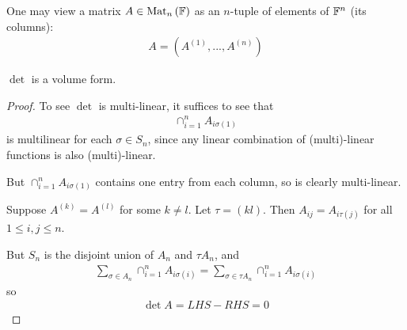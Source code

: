 \documentclass[a4paper]{article}
\begin{document}

One may view a matrix $A \in \operatorname{Mat}_n \left(\mathbb{F}\right)$ as an $n$-tuple of elements of $\mathbb{F}^n$ (its columns):
\begin{equation*}
\begin{aligned}
A = \left(A^{(1)},...,A^{(n)}\right)
\end{aligned}
\end{equation*}

\begin{lemma}
$\det$ is a volume form.
\begin{proof}
To see $\det$ is multi-linear, it suffices to see that 
\begin{equation*}
\begin{aligned}
\cap_{i=1}^n A_{i \sigma\left(1\right)}
\end{aligned}
\end{equation*}
is multilinear for each $\sigma \in S_n$, since any linear combination of (multi)-linear functions is also (multi)-linear.

But $\cap_{i=1}^n A_{i \sigma\left(1\right)}$ contains one entry from each column, so is clearly multi-linear.

Suppose $A^{(k)} = A^{(l)}$ for some $k \neq l$. Let $\tau = \left(kl\right)$. Then $A_{ij} = A_{i\tau\left(j\right)}$ for all $1 \leq i,j \leq n$.

But $S_n$ is the disjoint union of $A_n$ and $\tau A_n$, and
\begin{equation*}
\begin{aligned}
\sum_{\sigma \in A_n} \cap_{i=1}^n A_{i \sigma\left(i\right)} = \sum_{\sigma \in \tau A_n} \cap_{i=1}^n A_{i \sigma\left(i\right)}
\end{aligned}
\end{equation*}
so
\begin{equation*}
\begin{aligned}
\det A = LHS - RHS = 0
\end{aligned}
\end{equation*}
\end{proof}
\end{lemma}
\end{document}
